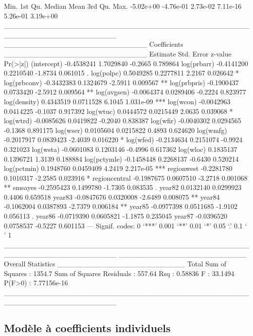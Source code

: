 \documentclass[a4paper]{article}
\begin{document}
\begin{Schunk}
\begin{Soutput}
     Min.   1st Qu.    Median      Mean   3rd Qu.      Max. 
-5.02e+00 -4.76e-01  2.73e-02  7.11e-16  5.26e-01  3.19e+00 
______________________________________________________________________ 
____________________________ Coefficients ____________________________
                Estimate Std. Error z-value  Pr(>|z|)    
(intercept)   -0.4538241  1.7029840 -0.2665  0.789864    
log(prbarr)   -0.4141200  0.2210540 -1.8734  0.061015 .  
log(polpc)     0.5049285  0.2277811  2.2167  0.026642 *  
log(prbconv)  -0.3432383  0.1324679 -2.5911  0.009567 ** 
log(prbpris)  -0.1900437  0.0733420 -2.5912  0.009564 ** 
log(avgsen)   -0.0064374  0.0289406 -0.2224  0.823977    
log(density)   0.4343519  0.0711528  6.1045 1.031e-09 ***
log(wcon)     -0.0042963  0.0414225 -0.1037  0.917392    
log(wtuc)      0.0444572  0.0215449  2.0635  0.039068 *  
log(wtrd)     -0.0085626  0.0419822 -0.2040  0.838387    
log(wfir)     -0.0040302  0.0294565 -0.1368  0.891175    
log(wser)      0.0105604  0.0215822  0.4893  0.624620    
log(wmfg)     -0.2017917  0.0839423 -2.4039  0.016220 *  
log(wfed)     -0.2134634  0.2151074 -0.9924  0.321023    
log(wsta)     -0.0601083  0.1203146 -0.4996  0.617362    
log(wloc)      0.1835137  0.1396721  1.3139  0.188884    
log(pctymle)  -0.1458448  0.2268137 -0.6430  0.520214    
log(pctmin)    0.1948760  0.0459409  4.2419 2.217e-05 ***
regionwest    -0.2281780  0.1010317 -2.2585  0.023916 *  
regioncentral -0.1987675  0.0607510 -3.2718  0.001068 ** 
smsayes       -0.2595423  0.1499780 -1.7305  0.083535 .  
year82         0.0132140  0.0299923  0.4406  0.659518    
year83        -0.0847676  0.0320008 -2.6489  0.008075 ** 
year84        -0.1062004  0.0387893 -2.7379  0.006184 ** 
year85        -0.0977398  0.0511685 -1.9102  0.056113 .  
year86        -0.0719390  0.0605821 -1.1875  0.235045    
year87        -0.0396520  0.0758537 -0.5227  0.601153    
---
Signif. codes:  0 ‘***’ 0.001 ‘**’ 0.01 ‘*’ 0.05 ‘.’ 0.1 ‘ ’ 1 
______________________________________________________________________ 
_________________________ Overall Statistics _________________________
Total Sum of Squares       : 1354.7
Sum of Squares Residuals   : 557.64
Rsq                        : 0.58836
F                          : 33.1494
P(F>0)                     : 7.77156e-16
______________________________________________________________________ 
\end{Soutput}
\end{Schunk}


\subsection{Modèle à coefficients individuels}
\end{document}
